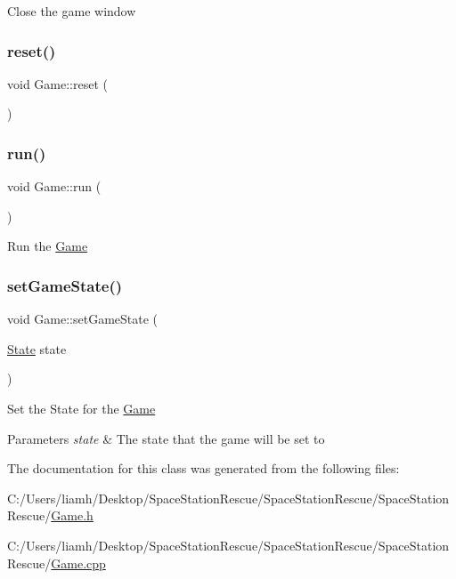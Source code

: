Close the game window 

\mbox{\label{class_game_a39bb2fd26b5ea6b164f28f9f6723582e}} 
\subsubsection{\texorpdfstring{reset()}{reset()}}
{\footnotesize\ttfamily void Game\+::reset (\begin{DoxyParamCaption}{ }\end{DoxyParamCaption})}

\mbox{\label{class_game_a1ab78f5ed0d5ea879157357cf2fb2afa}} 
\subsubsection{\texorpdfstring{run()}{run()}}
{\footnotesize\ttfamily void Game\+::run (\begin{DoxyParamCaption}{ }\end{DoxyParamCaption})}



Run the \mbox{\hyperlink{class_game}{Game}} 

\mbox{\label{class_game_aad5127a681fd55057a4fc717a4434bf6}} 
\subsubsection{\texorpdfstring{setGameState()}{setGameState()}}
{\footnotesize\ttfamily void Game\+::set\+Game\+State (\begin{DoxyParamCaption}\item[{\mbox{\hyperlink{_game_8h_a5d74787dedbc4e11c1ab15bf487e61f8}{State}}}]{state }\end{DoxyParamCaption})}



Set the State for the \mbox{\hyperlink{class_game}{Game}} 


\begin{DoxyParams}{Parameters}
{\em state} & The state that the game will be set to\\
\hline
\end{DoxyParams}


The documentation for this class was generated from the following files\+:\begin{DoxyCompactItemize}
\item 
C\+:/\+Users/liamh/\+Desktop/\+Space\+Station\+Rescue/\+Space\+Station\+Rescue/\+Space\+Station\+Rescue/\mbox{\hyperlink{_game_8h}{Game.\+h}}\item 
C\+:/\+Users/liamh/\+Desktop/\+Space\+Station\+Rescue/\+Space\+Station\+Rescue/\+Space\+Station\+Rescue/\mbox{\hyperlink{_game_8cpp}{Game.\+cpp}}\end{DoxyCompactItemize}
